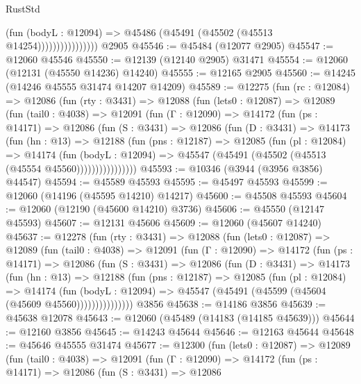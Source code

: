 \begin{lexlean}{RustStd}
\begin{coremodule}
                            (fun (bodyL : @12094) =>
                            @45486 (@45491 (@45502 (@45513 @14254))))))))))))))))
    @2905
@45546 := @45484 (@12077 @2905)
@45547 := @12060 @45546
@45550 := @12139 (@12140 @2905) @31471
@45554 := @12060 (@12131 (@45550 @14236) @14240)
@45555 := @12165 @2905
@45560 := @14245 (@14246 @45555 @31474 @14207 @14209)
@45589 := @12275
    (fun (rc : @12084) =>
    @12086
      (fun (rty : @3431) =>
      @12088
        (fun (lets0 : @12087) =>
        @12089
          (fun (tail0 : @4038) =>
          @12091
            (fun (Γ : @12090) =>
            @14172
              (fun (ps : @14171) =>
              @12086
                (fun (S : @3431) =>
                @12086
                  (fun (D : @3431) =>
                  @14173
                    (fun (hn : @13) =>
                    @12188
                      (fun (pns : @12187) =>
                      @12085
                        (fun (pl : @12084) =>
                        @14174
                          (fun (bodyL : @12094) =>
                          @45547 (@45491 (@45502 (@45513 (@45554 @45560))))))))))))))))
@45593 := @10346 (@3944 (@3956 @3856) @44547)
@45594 := @45589 @45593
@45595 := @45497 @45593
@45599 := @12060 (@14196 (@45595 @14210) @14217)
@45600 := @45508 @45593
@45604 := @12060 (@12190 (@45600 @14210) @3736)
@45606 := @45550 (@12147 @45593)
@45607 := @12131 @45606
@45609 := @12060 (@45607 @14240)
@45637 := @12278
    (fun (rty : @3431) =>
    @12088
      (fun (lets0 : @12087) =>
      @12089
        (fun (tail0 : @4038) =>
        @12091
          (fun (Γ : @12090) =>
          @14172
            (fun (ps : @14171) =>
            @12086
              (fun (S : @3431) =>
              @12086
                (fun (D : @3431) =>
                @14173
                  (fun (hn : @13) =>
                  @12188
                    (fun (pns : @12187) =>
                    @12085
                      (fun (pl : @12084) =>
                      @14174
                        (fun (bodyL : @12094) =>
                        @45547 (@45491 (@45599 (@45604 (@45609 @45560)))))))))))))))
    @3856
@45638 := @14186 @3856
@45639 := @45638 @12078
@45643 := @12060 (@45489 (@14183 (@14185 @45639)))
@45644 := @12160 @3856
@45645 := @14243 @45644
@45646 := @12163 @45644
@45648 := @45646 @45555 @31474
@45677 := @12300
    (fun (lets0 : @12087) =>
    @12089
      (fun (tail0 : @4038) =>
      @12091
        (fun (Γ : @12090) =>
        @14172
          (fun (ps : @14171) =>
          @12086
            (fun (S : @3431) =>
            @12086

\end{coremodule}
\end{lexlean}
